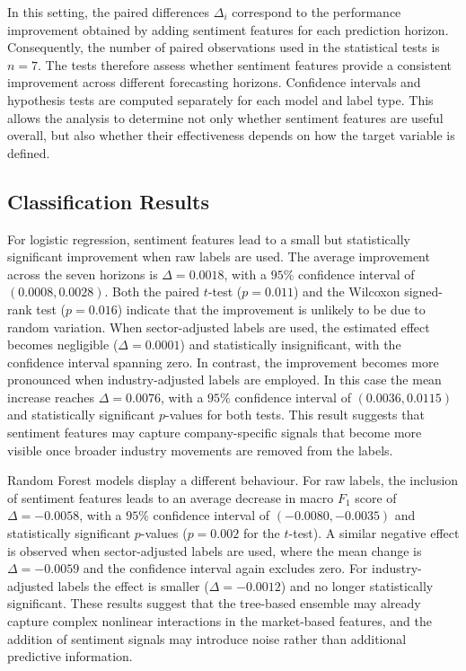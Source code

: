In this setting, the paired differences $\Delta_i$ correspond to the performance improvement obtained by adding sentiment features for each prediction horizon. Consequently, the number of paired observations used in the statistical tests is $n = 7$. The tests therefore assess whether sentiment features provide a consistent improvement across different forecasting horizons.
Confidence intervals and hypothesis tests are computed separately for each model and label type. This allows the analysis to determine not only whether sentiment features are useful overall, but also whether their effectiveness depends on how the target variable is defined.

\subsection{Classification Results}

For logistic regression, sentiment features lead to a small but statistically significant improvement when raw labels are used. The average improvement across the seven horizons is $\Delta = 0.0018$, with a $95\%$ confidence interval of $(0.0008, 0.0028)$. Both the paired $t$-test ($p = 0.011$) and the Wilcoxon signed-rank test ($p = 0.016$) indicate that the improvement is unlikely to be due to random variation. When sector-adjusted labels are used, the estimated effect becomes negligible ($\Delta = 0.0001$) and statistically insignificant, with the confidence interval spanning zero. In contrast, the improvement becomes more pronounced when industry-adjusted labels are employed. In this case the mean increase reaches $\Delta = 0.0076$, with a $95\%$ confidence interval of $(0.0036, 0.0115)$ and statistically significant $p$-values for both tests. This result suggests that sentiment features may capture company-specific signals that become more visible once broader industry movements are removed from the labels.

Random Forest models display a different behaviour. For raw labels, the inclusion of sentiment features leads to an average decrease in macro $F_1$ score of $\Delta = -0.0058$, with a $95\%$ confidence interval of $(-0.0080, -0.0035)$ and statistically significant $p$-values ($p = 0.002$ for the $t$-test). A similar negative effect is observed when sector-adjusted labels are used, where the mean change is $\Delta = -0.0059$ and the confidence interval again excludes zero. For industry-adjusted labels the effect is smaller ($\Delta = -0.0012$) and no longer statistically significant. These results suggest that the tree-based ensemble may already capture complex nonlinear interactions in the market-based features, and the addition of sentiment signals may introduce noise rather than additional predictive information.

